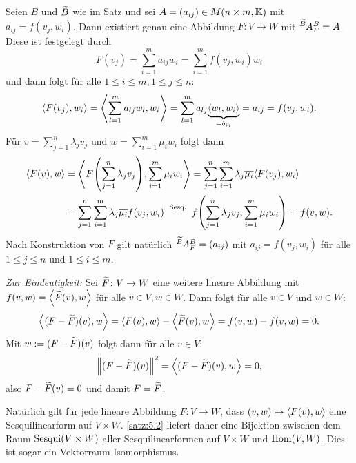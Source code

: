 \begin{beweis}
	Seien $B$ und $\widetilde{B}$ wie im Satz und sei $A = (a_{ij}) \in M(n \times m,\mathbb{K})$ mit $a_{ij} = f(v_j,w_i)$.
	Dann existiert genau eine Abbildung $F\colon V \rightarrow W$ mit $\mat{A}{\wt{B}}{B}{F} = A$.
	Diese ist festgelegt durch
	\[
		F(v_j) = \sum_{i=1}^{m} a_{ij} w_i = \sum_{i=1}^{m} f(v_j,w_i) w_i
	\]
	und dann folgt für alle $1 \leq i \leq m, 1 \leq j \leq n$:
	\[
		\left\langle F(v_j),w_i\right\rangle = \left\langle\sum_{l=1}^{m} a_{lj} w_l,w_i\right\rangle = \sum_{l=1}^{m} a_{lj} {\underbrace{\left\langle w_l,w_i\right\rangle}_{=\delta_{ij}}} = a_{ij} = f(v_j,w_i).
	\]
	\newpage
	Für $v = \sum_{j=1}^{n} \lambda_j v_j$ und $w = \sum_{i=1}^{m} \mu_i w_i$ folgt dann
	\begin{align*}
		\sk{F(v),w} &= \sk{F \enb{\sum_{j=1}^{n} \lambda_j v_j}, \sum_{i=1}^{m} \mu_i w_i} = \sum_{j=1}^{n} \sum_{i=1}^{m} \lambda_j \ol{\mu_i} \sk{F(v_j),w_i} \\
		&= \sum_{j=1}^{n} \sum_{i=1}^{m} \lambda_j \ol{\mu_i} f(v_j,w_i) \stack{\text{Sesq.}}{=} f \enb{\sum_{j=1}^{n} \lambda_j v_j , \sum_{i=1}^{m} \mu_i w_i} = f(v,w).
	\end{align*}
	Nach Konstruktion von $F$ gilt natürlich $\mat{A}{\wt{B}}{B}{F} = (a_{ij})$ mit $a_{ij} = f(v_j,w_i)$ für alle $1 \leq j \leq n$ und $1 \leq i \leq m$.
	
	\textit{Zur Eindeutigkeit:} Sei $\widetilde{F} \colon V \rightarrow W$ eine weitere lineare Abbildung mit $f(v,w) = \left\langle\widetilde{F}(v),w\right\rangle$ für alle $v \in V, w \in W$.
	Dann folgt für alle $v \in V$ und $w \in W$:
	\[
		\left\langle(F-\widetilde{F})(v),w\right\rangle = \left\langle F(v),w\right\rangle - \left\langle\widetilde{F}(v),w\right\rangle = f(v,w) - f(v,w) = 0.
	\]
	Mit $w := (F-\widetilde{F})(v)$ folgt dann für alle $v \in V$:
	\[
		\left\lVert(F-\widetilde{F})(v)\right\rVert^2 = \left\langle(F - \widetilde{F})(v),w\right\rangle = 0,
	\]
	also $F - \widetilde{F}(v) = 0$ und damit $F = \widetilde{F}$. \qedhere
\end{beweis}

\begin{bemerkung}
	\label{bem:5.3}
	Natürlich gilt für jede lineare Abbildung $F \colon V \rightarrow W$, dass $(v,w) \mapsto \left\langle F(v),w\right\rangle$ eine Sesquilinearform auf $V \times W$.
	\autoref{satz:5.2} liefert daher eine Bijektion zwischen dem Raum $\operatorname{Sesqui}(V \times W)$ aller Sesquilinearformen auf $V \times W$ und $\operatorname{Hom}(V,W)$. 
	Dies ist sogar ein Vektorraum-Isomorphismus.
\end{bemerkung}

